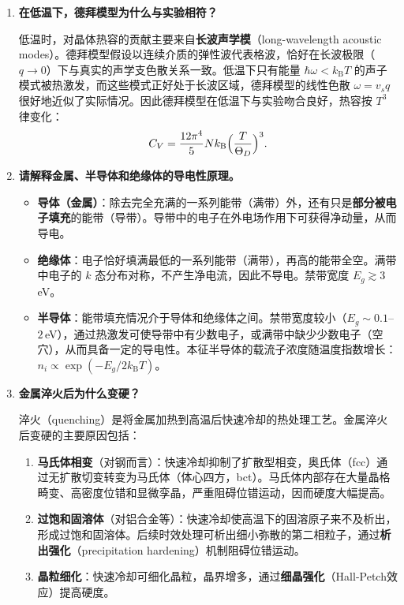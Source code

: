 \begin{enumerate}[label=\textbf{\arabic*.}, leftmargin=2em, itemsep=0.8em, resume]

\item \textbf{在低温下，德拜模型为什么与实验相符？}

低温时，对晶体热容的贡献主要来自\textbf{长波声学模}（long-wavelength acoustic modes）。德拜模型假设以连续介质的弹性波代表格波，恰好在长波极限（$q\to 0$）下与真实的声学支色散关系一致。低温下只有能量 $\hbar\omega < k_{\text{B}}T$ 的声子模式被热激发，而这些模式正好处于长波区域，德拜模型的线性色散 $\omega = v_s q$ 很好地近似了实际情况。因此德拜模型在低温下与实验吻合良好，热容按 $T^3$ 律变化：
\[
    C_V = \frac{12\pi^4}{5} N k_{\text{B}} \Bigl(\frac{T}{\Theta_D}\Bigr)^3.
\]

\item \textbf{请解释金属、半导体和绝缘体的导电性原理。}

\begin{itemize}[nosep]
    \item \textbf{导体（金属）}：除去完全充满的一系列能带（满带）外，还有只是\textbf{部分被电子填充}的能带（导带）。导带中的电子在外电场作用下可获得净动量，从而导电。
    \item \textbf{绝缘体}：电子恰好填满最低的一系列能带（满带），再高的能带全空。满带中电子的 $k$ 态分布对称，不产生净电流，因此不导电。禁带宽度 $E_g \gtrsim 3\,$eV。
    \item \textbf{半导体}：能带填充情况介于导体和绝缘体之间。禁带宽度较小（$E_g \sim 0.1$--$2\,$eV），通过热激发可使导带中有少数电子，或满带中缺少少数电子（空穴），从而具备一定的导电性。本征半导体的载流子浓度随温度指数增长：$n_i \propto \exp(-E_g/2k_{\text{B}}T)$。
\end{itemize}

\item \textbf{金属淬火后为什么变硬？}

淬火（quenching）是将金属加热到高温后快速冷却的热处理工艺。金属淬火后变硬的主要原因包括：
\begin{enumerate}[nosep, label=(\arabic*)]
    \item \textbf{马氏体相变}（对钢而言）：快速冷却抑制了扩散型相变，奥氏体（fcc）通过无扩散切变转变为马氏体（体心四方，bct）。马氏体内部存在大量晶格畸变、高密度位错和显微孪晶，严重阻碍位错运动，因而硬度大幅提高。
    \item \textbf{过饱和固溶体}（对铝合金等）：快速冷却使高温下的固溶原子来不及析出，形成过饱和固溶体。后续时效处理可析出细小弥散的第二相粒子，通过\textbf{析出强化}（precipitation hardening）机制阻碍位错运动。
    \item \textbf{晶粒细化}：快速冷却可细化晶粒，晶界增多，通过\textbf{细晶强化}（Hall-Petch效应）提高硬度。
\end{enumerate}


\end{enumerate}
